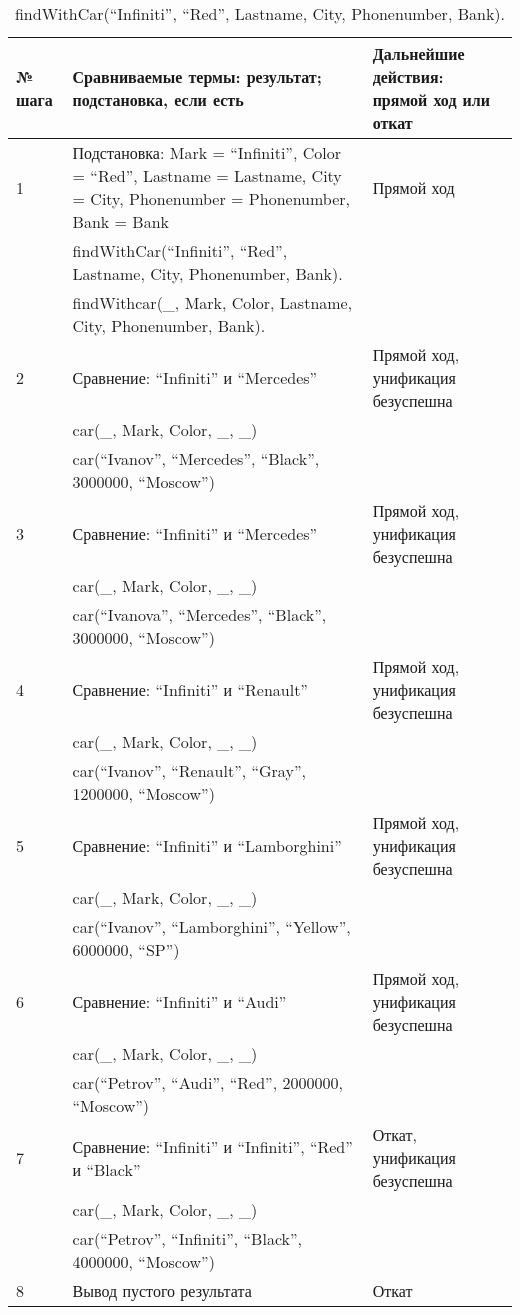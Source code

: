 {
\small
\begin{longtable}{|p{1.15cm}|p{8cm}|p{8cm}|}
    \caption{findWithCar(``Infiniti'', ``Red'', Lastname, City, Phonenumber, Bank).} \\
    \hline
    № шага & Сравниваемые термы: результат; подстановка, если есть & Дальнейшие действия: прямой ход или откат \\
    \hline
    1 & Подстановка: Mark = ``Infiniti'', Color = ``Red'', Lastname = Lastname, City = City, Phonenumber = Phonenumber, Bank = Bank & Прямой ход \\
      & findWithCar(``Infiniti'', ``Red'', Lastname, City, Phonenumber, Bank). & \\
      & findWithcar(\_, Mark, Color, Lastname, City, Phonenumber, Bank). & \\
    \hline
    2 & Сравнение: ``Infiniti'' и ``Mercedes'' & Прямой ход, унификация безуспешна \\
      & car(\_, Mark, Color, \_, \_) & \\
      & car(``Ivanov'', ``Mercedes'', ``Black'', 3000000, ``Moscow'') & \\
    \hline
    3 & Сравнение: ``Infiniti'' и ``Mercedes'' & Прямой ход, унификация безуспешна \\
      & car(\_, Mark, Color, \_, \_) & \\
      & car(``Ivanova'', ``Mercedes'', ``Black'', 3000000, ``Moscow'') & \\
    \hline
    4 & Сравнение: ``Infiniti'' и ``Renault'' & Прямой ход, унификация безуспешна \\
      & car(\_, Mark, Color, \_, \_) & \\
      & car(``Ivanov'', ``Renault'', ``Gray'', 1200000, ``Moscow'') & \\
    \hline
    5 & Сравнение: ``Infiniti'' и ``Lamborghini'' & Прямой ход, унификация безуспешна \\
      & car(\_, Mark, Color, \_, \_) & \\
      & car(``Ivanov'', ``Lamborghini'', ``Yellow'', 6000000, ``SP'') & \\
    \hline
    6 & Сравнение: ``Infiniti'' и ``Audi'' & Прямой ход, унификация безуспешна \\
      & car(\_, Mark, Color, \_, \_) & \\
      & car(``Petrov'', ``Audi'', ``Red'', 2000000, ``Moscow'') & \\
    \hline
    7 & Сравнение: ``Infiniti'' и ``Infiniti'', ``Red'' и ``Black'' & Откат, унификация безуспешна \\
      & car(\_, Mark, Color, \_, \_) & \\
      & car(``Petrov'', ``Infiniti'', ``Black'', 4000000, ``Moscow'') & \\
    \hline
    8 & Вывод пустого результата & Откат \\
    \hline
\end{longtable}
}

